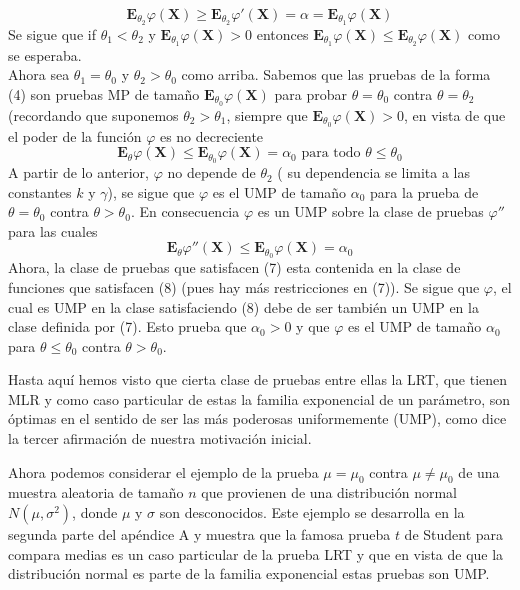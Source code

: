 \documentclass[peerreview]{IEEEtran}
\begin{document}
\[
\mathbf{E}_{\theta_2}\varphi(\mathbf{X}) \geq \mathbf{E}_{\theta_2}\varphi ' (\mathbf{X}) = \alpha = \mathbf{E}_{\theta_1}\varphi(\mathbf{X})
\]
Se sigue que if $\theta_1 < \theta_2$ y $\mathbf{E}_{\theta_1}\varphi(\mathbf{X})>0$ entonces $\mathbf{E}_{\theta_1}\varphi(\mathbf{X}) \leq \mathbf{E}_{\theta_2}\varphi(\mathbf{X})$ como se esperaba.\\
Ahora sea $\theta_1 = \theta_0$ y $\theta_2  > \theta_0$ como arriba. Sabemos que las pruebas de la forma (4) son pruebas MP de tamaño $\mathbf{E}_{\theta_0}\varphi(\mathbf{X})$ para probar $\theta = \theta_0$ contra $\theta = \theta_2$ (recordando que suponemos $\theta_2 > \theta_1$, siempre que   $\mathbf{E}_{\theta_0}\varphi(\mathbf{X}) > 0$, en vista de que el poder de la función $\varphi$ es no decreciente 
\begin{equation}
		\mathbf{E}_{\theta}\varphi(\mathbf{X}) \leq \mathbf{E}_{\theta_0}\varphi(\mathbf{X}) = \alpha_0 \textrm{    para todo    } \theta \leq \theta_0	
\end{equation}
A partir de lo anterior, $\varphi$ no depende de $\theta_2$ ( su dependencia se limita a las constantes $k$ y $\gamma$), se sigue que $\varphi$ es el UMP de tamaño $\alpha_0$ para la prueba de $\theta=\theta_0$ contra $\theta > \theta_0$. En consecuencia $\varphi$ es un UMP sobre la clase de pruebas $\varphi'' $ para las cuales 
\begin{equation}
		\mathbf{E}_{\theta}\varphi''(\mathbf{X}) \leq \mathbf{E}_{\theta_0}\varphi(\mathbf{X}) = \alpha_0	
\end{equation}
Ahora, la clase de pruebas que satisfacen (7) esta contenida en la clase de funciones que satisfacen (8) (pues hay más restricciones en (7)). Se sigue que $\varphi$, el cual es UMP en la clase satisfaciendo (8) debe de ser también un UMP en la clase definida por (7). Esto prueba que $\alpha_0 > 0$ y que $\varphi$ es el UMP de tamaño $\alpha_0$ para $\theta \leq \theta_0$ contra $\theta > \theta_0$.

Hasta aquí hemos visto que cierta clase de pruebas entre ellas la LRT, que tienen MLR y como caso particular de estas la familia exponencial de un parámetro,  son óptimas en el sentido de ser las más poderosas uniformemente (UMP), como dice la tercer afirmación de nuestra motivación inicial.

Ahora podemos considerar el ejemplo de la prueba $\mu = \mu_0$ contra $\mu \ne \mu_0$ de una muestra aleatoria de tamaño $n$ que provienen de una distribución normal $N(\mu,\sigma^2)$, donde $\mu$ y $\sigma$ son desconocidos. Este ejemplo se desarrolla en la segunda parte del apéndice A y muestra que la famosa prueba $t$ de Student para compara medias es un caso particular de la prueba LRT y que en vista de que la distribución normal es parte de la familia exponencial estas pruebas son UMP.
\end{document}
